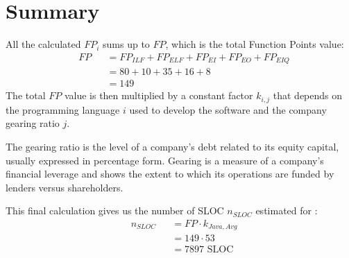 \section{Summary}
All the calculated $FP_{i}$ sums up to $FP$, which is the total Function Points value:
\begin{equation*}
	\begin{aligned}
		&	FP
		& & = FP_{ILF} + FP_{ELF} + FP_{EI} + FP_{EO} + FP_{EIQ}\\
		&&& = 80 + 10 + 35 + 16 + 8\\
		&&& = 149\
	\end{aligned}
\end{equation*}
The total $FP$ value is then multiplied by a constant factor $k_{i,j}$ that depends on the programming language $i$ used to develop the software and the company gearing ratio $j$.\par
The gearing ratio is the level of a company's debt related to its equity capital, usually expressed in percentage form.
Gearing is a measure of a company's financial leverage and shows the extent to which its operations are funded by lenders versus shareholders.\par
This final calculation gives us the number of SLOC $n_{SLOC}$ estimated for \PowerEnJoy{}:
\begin{equation*}
	\begin{aligned}
		&   n_{SLOC}
		& & = FP \cdot k_{Java, Avg}\\
		&&& = 149 \cdot 53\\
		&&& = 7897 \text{ SLOC}
	\end{aligned}
\end{equation*}
%
